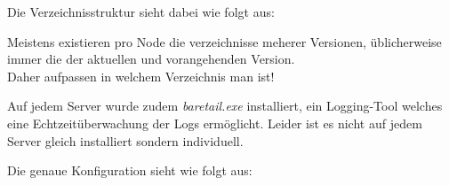 \begin{flushleft}
    Die Verzeichnisstruktur sieht dabei wie folgt aus:



%


    \begin{mdframed}
    Meistens existieren pro Node die verzeichnisse meherer Versionen, üblicherweise immer die der aktuellen und vorangehenden Version.\\Daher aufpassen in welchem Verzeichnis man ist!
    \end{mdframed}

    Auf jedem Server wurde zudem \textit{baretail.exe} installiert, ein Logging-Tool welches eine Echtzeitüberwachung der Logs ermöglicht.
    Leider ist es nicht auf jedem Server gleich installiert sondern individuell.
\end{flushleft}
\begin{flushleft}
    Die genaue Konfiguration sieht wie folgt aus:
\end{flushleft}
